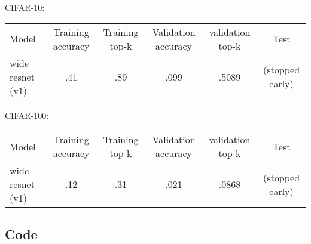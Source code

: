 \documentclass[12pt]{article}
\begin{document}
CIFAR-10:

\begin{center}
	\begin{tabular}{ l c c c c c}
		Model & Training accuracy & Training top-k & Validation accuracy & validation top-k & Test \\
		wide resnet (v1) & .41 & .89 & .099 & .5089 & (stopped early) \\
	\end{tabular}
\end{center}

CIFAR-100:

\begin{center}
	\begin{tabular}{ l c c c c c}
		Model & Training accuracy & Training top-k & Validation accuracy & validation top-k & Test \\
		wide resnet (v1) & .12 & .31 & .021 & .0868 & (stopped early) \\
	\end{tabular}
\end{center}

\clearpage
\begin{adjustwidth}{-50pt}{0pt}

\section{Code}

\begin{Verbatim}

\end{Verbatim}
\end{adjustwidth}
\end{document}
